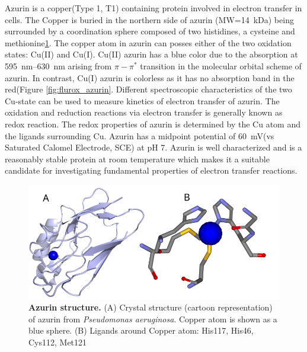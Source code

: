 Azurin is a copper(Type 1, T1) containing protein involved in electron transfer in cells.\cite{dennison2005investigating,kolczak2006handbook}
The Copper is buried in the northern side of azurin (MW=\SI{14}{\kilo\dalton}) being surrounded by a coordination sphere composed of two histidines, a cysteine and methionine\ref{fig:azurin_structure}.
The copper atom in azurin can posses either of the two oxidation states: Cu(II) and Cu(I).
Cu(II) azurin has a blue color due to the absorption at \SIrange{595}{630}{\nm} arising from $\pi - \pi^*$ transition in the molecular orbital scheme of azurin.\cite{dooley1981spectroscopic,schmauder2005sensitive}
In contrast, Cu(I) azurin is colorless as it has no absorption band in the red(Figure \ref{fig:flurox_azurin}.
Different spectroscopic characteristics of the two Cu-state can be used to measure kinetics of electron transfer of azurin.
The oxidation and reduction reactions via electron transfer is generally known as redox reaction.
The redox properties of azurin is determined by the Cu atom and the ligands surrounding Cu.
Azurin has a midpoint potential of \SI{60}{\mV}(vs Saturated Calomel Electrode, SCE) at pH 7.
Azurin is well characterized and is a reasonably stable protein at room temperature which makes it a suitable candidate for investigating fundamental properties of electron transfer reactions.
\begin{figure}
	\centering
	\includegraphics[width=\textwidth]{azurin_structure}
	\caption{\textbf{Azurin structure.} (A) Crystal structure (cartoon representation) of azurin from \textit{Pseudomonas aeruginosa}.\cite{adman1981structural}
	Copper atom is shown as a blue sphere.
	(B) Ligands around Copper atom: His117, His46, Cys112, Met121}
	\label{fig:azurin_structure}
\end{figure}

